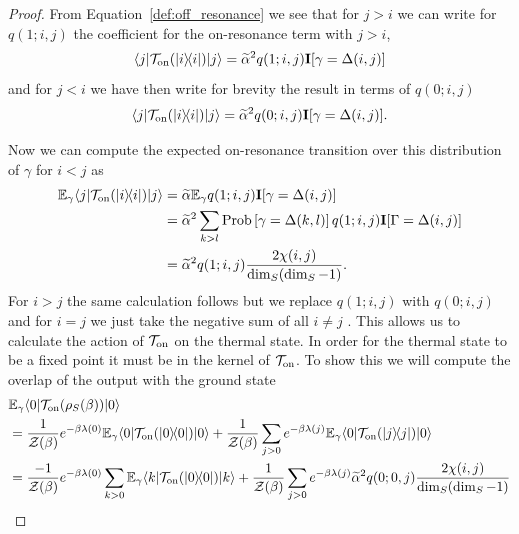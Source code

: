\documentclass{article}
\newcommand{\on}{\rm on}
\newcommand{\ket}[1]{|#1\rangle}
\newcommand{\bra}[1]{\langle #1|}
\newcommand{\ketbra}[2]{| #1\rangle\! \langle #2|}
\newcommand{\prob}[1]{{\rm Prob}\left[ #1 \right]}
\newcommand{\partfun}{\mathcal{Z}}
\begin{document}
\begin{proof}
From Equation~\ref{def:off_resonance} we see that for $j > i$ we can write for $q(1;i,j)$ the coefficient for the on-resonance term with $j>i$, 
\begin{equation}
    \bra{j} \mathcal{T}_{\on}(\ketbra{i}{i}) \ket{j} = \widetilde{\alpha}^2 q(1; i, j) \mathbf{I}[\gamma = \Delta(i,j)]
\end{equation} 
and for $j < i$ we have then write for brevity the result in terms of $q(0;i,j)$ 
\begin{equation}\bra{j} \mathcal{T}_{\on}(\ketbra{i}{i}) \ket{j} = \widetilde{\alpha}^2 q(0; i, j) \mathbf{I}[\gamma = \Delta(i,j)].
\end{equation}

Now we can compute the expected on-resonance transition over this distribution of $\gamma$ for $i < j$ as
\begin{align}
    \mathbb{E}_{\gamma} \bra{j} \mathcal{T}_{\on}(\ketbra{i}{i}) \ket{j} &= \widetilde{\alpha} \mathbb{E}_{\gamma} q(1; i, j) \mathbf{I}[\gamma = \Delta(i,j)] \\
    &= \widetilde{\alpha}^2 \sum_{k > l} \prob{\gamma = \Delta(k,l)} q(1; i,j) \mathbf{I}[\Gamma = \Delta(i,j)] \\
    &= \widetilde{\alpha}^2 q(1; i,j) \frac{2 \chi(i,j)}{\dim_S(\dim_S - 1)}.
\end{align}
For $ i > j$ the same calculation follows but we replace $q(1; i, j)$ with $q(0;i,j)$ and for $i = j$ we just take the negative sum of all $i \neq j$ . This allows us to calculate the action of $\mathcal{T}_{\on}$ on the thermal state. In order for the thermal state to be a fixed point it must be in the kernel of $\mathcal{T}_{\on}$. To show this we will compute the overlap of the output with the ground state
\begin{align}
    &\mathbb{E}_{\gamma} \bra{0} \mathcal{T}_{\on}(\rho_S(\beta)) \ket{0} \nonumber \\
    &= \frac{1}{\partfun(\beta)} e^{-\beta \lambda(0)} \mathbb{E}_{\gamma} \bra{0} \mathcal{T}_{\on}(\ketbra{0}{0})\ket{0} + \frac{1}{\partfun(\beta)} \sum_{j > 0} e^{-\beta \lambda(j)} \mathbb{E}_{\gamma}  \bra{0} \mathcal{T}_{\on}(\ketbra{j}{j}) \ket{0} \nonumber\\
    &= \frac{-1}{\partfun(\beta)} e^{-\beta \lambda(0)} \sum_{k > 0} \mathbb{E}_{\gamma} \bra{k} \mathcal{T}_{\on}(\ketbra{0}{0}) \ket{k} + \frac{1}{\partfun(\beta)} \sum_{j > 0} e^{-\beta \lambda(j)} \widetilde{\alpha}^2 q(0; 0, j) \frac{2 \chi(i,j)}{\dim_S (\dim_S - 1)} \nonumber\\

\end{align}
\end{proof}
\end{document}
